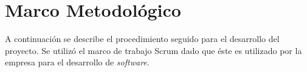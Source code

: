 \chapter{Marco Metodológico} \label{chap:Marco Metodologico}

A continuación se describe el procedimiento seguido para el desarrollo del proyecto. Se utilizó el marco de trabajo Scrum dado que éste es utilizado por la empresa para el desarrollo de \textit{software}.